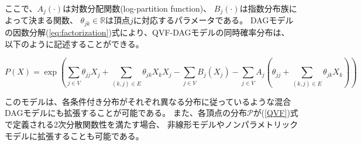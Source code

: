 ここで、$A_j(\cdot)$は対数分配関数(log-partition function)、
$B_j(\cdot)$は指数分布族によって決まる関数、
$\theta_{jk}\in \mathbb R$は頂点$j$に対応するパラメータである。
DAGモデルの因数分解(\ref{eq:factorization})式により、QVF-DAGモデルの同時確率分布は、
以下のように記述することができる。

\begin{equation}
  P(X) = \exp \left( \sum_{j\in V} \theta_{jj}X_j + \sum_{(k,j)\in E} \theta_{jk}X_k X_j
  - \sum_{j \in V} B_j(X_j) - \sum_{j \in V} A_j
  \left( \theta_{jj} + \sum_{(k,j)\in E} \theta_{jk} X_k \right)\right)
  \label{eq:QVF_factorization}
\end{equation}

このモデルは、各条件付き分布がそれぞれ異なる分布に従っているような混合DAGモデルにも拡張することが可能である。
また、各頂点の分布$\mathcal P$が(\ref{QVF})式で定義される2次分散関数性を満たす場合、
非線形モデルやノンパラメトリックモデルに拡張することも可能である。
